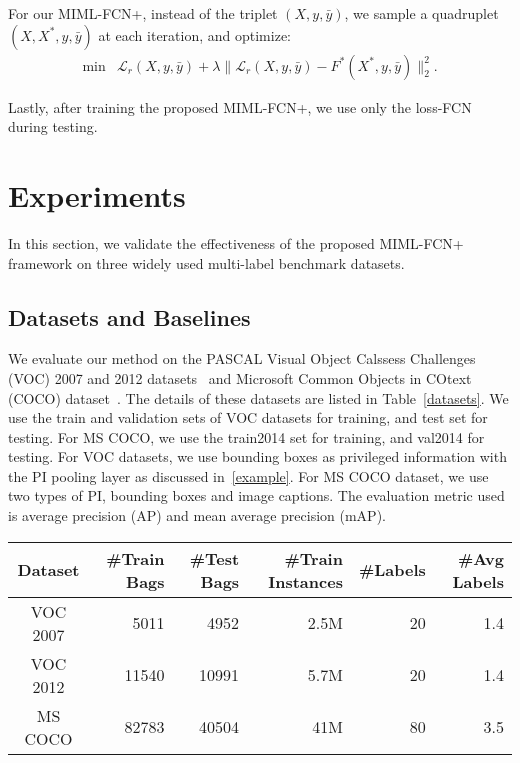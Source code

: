 \documentclass[10pt,twocolumn,letterpaper]{article}
\begin{document}
For our \textsc{MIML-FCN+}, instead of the triplet
$(X,y,\bar{y})$, we sample a quadruplet  $(X,X^*,y,\bar{y})$ at
each iteration, and optimize:
\begin{equation}
\label{label-rank-obj}
\begin{matrix}
\min & \mathcal{L}_{r}(X,y,\bar{y}) +
\lambda\|\mathcal{L}_{r}(X,y,\bar{y}) -F^*(X^*,y,\bar{y})\|_2^2.
\end{matrix}
\end{equation}

Lastly, after training the proposed MIML-FCN+, we use only the loss-FCN during testing.

\section{Experiments}
\label{exp} In this section, we validate the effectiveness of the
proposed \textsc{MIML-FCN+} framework on three widely used
multi-label benchmark datasets.

\subsection{Datasets and Baselines}
We evaluate our method on the PASCAL Visual Object Calssess
Challenges (VOC) 2007 and 2012 datasets~\cite{VOC} and Microsoft
Common Objects in COtext (COCO) dataset~\cite{COCO}. The details
of these datasets are listed in Table~\ref{datasets}. We use the
train and validation sets of \textsc{VOC} datasets for training,
and test set for testing. For \textsc{MS COCO}, we use the
train2014 set for training, and val2014 for testing. For
\textsc{VOC} datasets, we use bounding boxes as privileged
information with the PI pooling layer as discussed
in~\ref{example}. For \textsc{MS COCO} dataset, we use two types
of PI, bounding boxes and image captions. The evaluation metric
used is average precision (AP) and mean average precision (mAP).

\begin{table*}
	\centering
	\caption{Dataset Information} \label{datasets}
	\begin{tabular}{c | r r r r r }
		\hline
		Dataset &\#Train Bags &\#Test Bags &\#Train Instances &\#Labels &\#Avg Labels \\ \hline
		\textsc{VOC 2007} &5011 &4952 &2.5M &20 &1.4\\
		\textsc{VOC 2012} &11540 &10991 &5.7M &20 &1.4\\
		\textsc{MS COCO} &82783 &40504 &41M &80 &3.5\\
	\end{tabular}
\end{table*}
\end{document}
